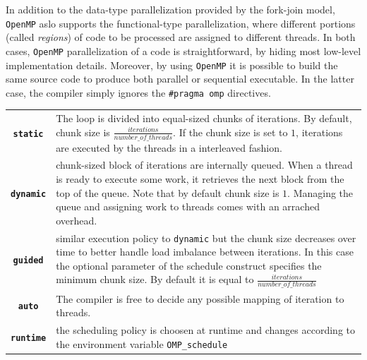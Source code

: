 \begin{description}
    In addition to the data-type parallelization provided by the
    fork-join model, \texttt{OpenMP} aslo supports the functional-type
    parallelization, where different portions (called \textit{regions}) of code to be
    processed are assigned to different threads. In both cases, \texttt{OpenMP}
    parallelization of a code is straightforward, by hiding most
    low-level implementation details.
    Moreover, by using \texttt{OpenMP} it is
    possible to build the same source code to produce both parallel or
    sequential executable. In the latter case, the compiler simply
    ignores the \texttt{\#pragma omp} directives.
    \begin{table}
    	   	\begin{tabularx}{1.0\textwidth}{cX}
    		\rowcolor{gray!35}	
    		\heading{\textbf{Scheduling Kind}} &  \heading{\textbf{Description}} \\ \hline
    		\rowcolor{gray!15}
    		\texttt{\textbf{static}} & The loop is divided into equal-sized chunks of iterations. By default, chunk size is $\frac{iterations}{number\_of\_threads}$. If the chunk size is set to $1$, iterations are executed by the threads in a interleaved fashion.\\ \hline
    		\rowcolor{gray!5}
    		\texttt{\textbf{dynamic}} & chunk-sized block of iterations are internally queued. When a thread is ready to execute some work, it retrieves the next block  from the top of the queue. Note that by default chunk size is $1$. Managing the queue and assigning work to threads comes with an arrached overhead.\\ \hline
    		
    		\rowcolor{gray!15}
    		\texttt{\textbf{guided}} & similar execution policy  to \texttt{dynamic} but the chunk size decreases over time to better handle load imbalance between iterations. In this case the optional parameter of the schedule construct specifies the minimum chunk size. By default it is equal to $\frac{iterations}{number\_of\_threads}$\\ \hline
    		
    		\rowcolor{gray!5}
    		\texttt{\textbf{auto}} & The compiler is free to decide any possible mapping of iteration to threads.\\ \hline
    		
    		\rowcolor{gray!15}
    		\texttt{\textbf{runtime}} & the scheduling policy is choosen at runtime and changes according to the environment variable \verb|OMP_schedule| \\ \hline
    	\end{tabularx}
    

\end{table}
\end{description}
